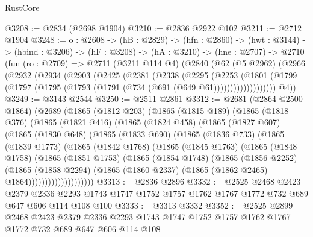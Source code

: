 \begin{lexlean}{RustCore}
\begin{coremodule}
@3208 := @2834 (@2698 @1904)
@3210 := @2836 @2922 @102
@3211 := @2712 @1904
@3248 := {o : @2608} ->
  (hB : @2829) ->
  (hfn : @2860) ->
  (hwt : @3144) ->
  (hbind : @3206) ->
  (hF : @3208) ->
  (hA : @3210) ->
  (hne : @2707) ->
  @2710
    (fun (ro : @2709) =>
    @2711
      (@3211 @114 @4)
      (@2840
        (@62
          (@5 @2962)
          (@2966
            (@2932
              (@2934
                (@2903
                  (@2425
                    (@2381
                      (@2338
                        (@2295
                          (@2253
                            (@1801
                              (@1799
                                (@1797 (@1795 (@1793 (@1791 (@734 (@691 (@649 @61)))))))))))))))))))
        @4))
@3249 := @3143 @2544
@3250 := @2511 @2861
@3312 := @2681
    (@2864 @2500 @1864)
    (@2689
      (@1865
        (@1812 @203)
        (@1865
          (@1815 @189)
          (@1865
            (@1818 @376)
            (@1865
              (@1821 @416)
              (@1865
                (@1824 @458)
                (@1865
                  (@1827 @607)
                  (@1865
                    (@1830 @648)
                    (@1865
                      (@1833 @690)
                      (@1865
                        (@1836 @733)
                        (@1865
                          (@1839 @1773)
                          (@1865
                            (@1842 @1768)
                            (@1865
                              (@1845 @1763)
                              (@1865
                                (@1848 @1758)
                                (@1865
                                  (@1851 @1753)
                                  (@1865
                                    (@1854 @1748)
                                    (@1865
                                      (@1856 @2252)
                                      (@1865
                                        (@1858 @2294)
                                        (@1865
                                          (@1860 @2337)
                                          (@1865 (@1862 @2465) @1864))))))))))))))))))))
@3313 := @2836 @2896
@3332 := @2525
    @2468
    @2423
    @2379
    @2336
    @2293
    @1743
    @1747
    @1752
    @1757
    @1762
    @1767
    @1772
    @732
    @689
    @647
    @606
    @114
    @108
    @100
@3333 := @3313 @3332
@3352 := @2525
    @2899
    @2468
    @2423
    @2379
    @2336
    @2293
    @1743
    @1747
    @1752
    @1757
    @1762
    @1767
    @1772
    @732
    @689
    @647
    @606
    @114
    @108

\end{coremodule}
\end{lexlean}
